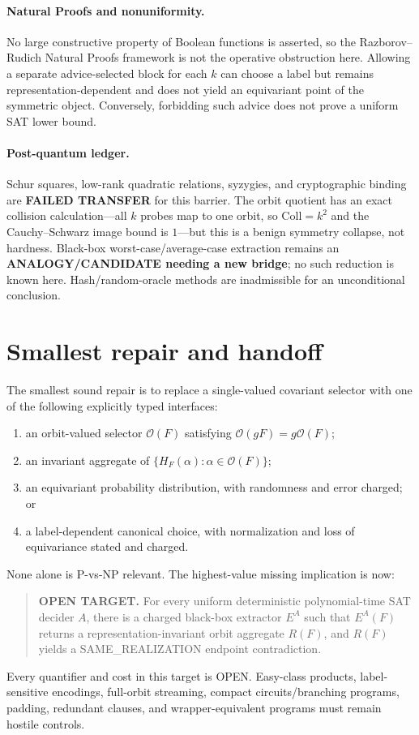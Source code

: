\documentclass[11pt]{article}
\begin{document}
\paragraph{Natural Proofs and nonuniformity.}
No large constructive property of Boolean functions is asserted, so the Razborov--Rudich Natural Proofs framework is not the operative obstruction here.  Allowing a separate advice-selected block for each $k$ can choose a label but remains representation-dependent and does not yield an equivariant point of the symmetric object.  Conversely, forbidding such advice does not prove a uniform SAT lower bound.

\paragraph{Post-quantum ledger.}
Schur squares, low-rank quadratic relations, syzygies, and cryptographic binding are \textbf{FAILED TRANSFER} for this barrier.  The orbit quotient has an exact collision calculation---all $k$ probes map to one orbit, so $\mathrm{Coll}=k^2$ and the Cauchy--Schwarz image bound is $1$---but this is a benign symmetry collapse, not hardness.  Black-box worst-case/average-case extraction remains an \textbf{ANALOGY/CANDIDATE needing a new bridge}; no such reduction is known here.  Hash/random-oracle methods are inadmissible for an unconditional conclusion.

\section{Smallest repair and handoff}

The smallest sound repair is to replace a single-valued covariant selector with one of the following explicitly typed interfaces:
\begin{enumerate}
\item an orbit-valued selector $\mathcal O(F)$ satisfying $\mathcal O(gF)=g\mathcal O(F)$;
\item an invariant aggregate of $\{H_F(\alpha):\alpha\in\mathcal O(F)\}$;
\item an equivariant probability distribution, with randomness and error charged; or
\item a label-dependent canonical choice, with normalization and loss of equivariance stated and charged.
\end{enumerate}
None alone is P-vs-NP relevant.  The highest-value missing implication is now:
\begin{quote}
\textbf{OPEN TARGET.} For every uniform deterministic polynomial-time SAT
decider $A$, there is a charged black-box extractor $E^A$ such that $E^A(F)$
returns a representation-invariant orbit aggregate $R(F)$, and $R(F)$ yields a
SAME\_REALIZATION endpoint contradiction.
\end{quote}
Every quantifier and cost in this target is OPEN.  Easy-class products, label-sensitive encodings, full-orbit streaming, compact circuits/branching programs, padding, redundant clauses, and wrapper-equivalent programs must remain hostile controls.
\end{document}
